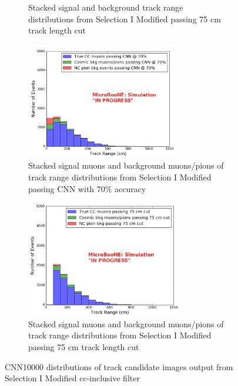 \begin{figure}[htp!]
\begin{subfigure}[b]{.45\textwidth}
	\caption{Stacked signal and background track range distributions from Selection I Modified passing 75 cm track length cut}
	\label{fig:sel1mod_stackedoriginal}
	\end{subfigure}
	\quad
	\begin{subfigure}[b]{.45\textwidth}
	\includegraphics[width=\textwidth, height=2in]{figs/sel1mod_cnn_trackrange_mupi_acc70_0707.png}
	\caption{Stacked signal muons and background muons/pions of track range distributions from Selection I Modified passing CNN with 70\% accuracy}
	\label{fig:sel1mod_mupi_70stackedcnn}
	\end{subfigure}
	\quad
	\begin{subfigure}[b]{.45\textwidth}
	\includegraphics[width=\textwidth, height=2in]{figs/sel1mod_original_trackrange_mupi_acc70_0707.png}
	\caption{Stacked signal muons and background muons/pions of track range distributions from Selection I Modified passing 75 cm track length cut}
	\label{fig:sel1mod_mupi_70stackedoriginal}
	\end{subfigure}
	\quad
\caption{CNN10000 distributions of track candidate images output from Selection I Modified cc-inclusive filter}
\label{fig:sel1mod_CNN_dist}
\end{figure}




